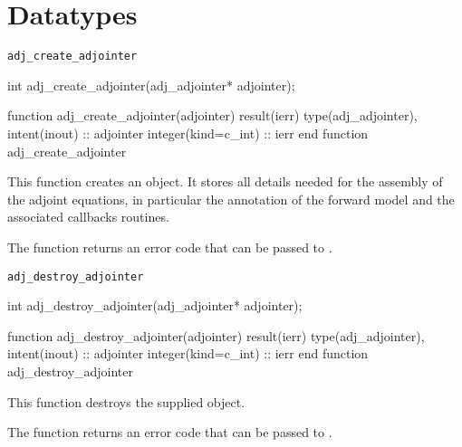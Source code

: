 \chapter{Datatypes}
\begin{synopsis}
\end{synopsis}
\minitoc
\vspace{\fill}
\newpage

\begin{boxwithtitle}{\texttt{adj_create_adjointer}}
\begin{minipage}{\columnwidth}
\begin{ccode}
  int adj_create_adjointer(adj_adjointer* adjointer);
\end{ccode}
\begin{fortrancode}
  function adj_create_adjointer(adjointer) result(ierr) 
    type(adj_adjointer), intent(inout) :: adjointer
    integer(kind=c_int) :: ierr
  end function adj_create_adjointer
\end{fortrancode}
\end{minipage}
\end{boxwithtitle}

This function creates an  object. 
It stores all details needed for the assembly of the adjoint equations, in particular the annotation of the forward model and the associated callbacks routines.

The function returns an error code that can be passed to .

\begin{boxwithtitle}{\texttt{adj_destroy_adjointer}}
\begin{minipage}{\columnwidth}
\begin{ccode}
  int adj_destroy_adjointer(adj_adjointer* adjointer);
\end{ccode}
\begin{fortrancode}
  function adj_destroy_adjointer(adjointer) result(ierr) 
    type(adj_adjointer), intent(inout) :: adjointer
    integer(kind=c_int) :: ierr
  end function adj_destroy_adjointer
\end{fortrancode}
\end{minipage}
\end{boxwithtitle}

This function destroys the supplied  object.

The function returns an error code that can be passed to .

